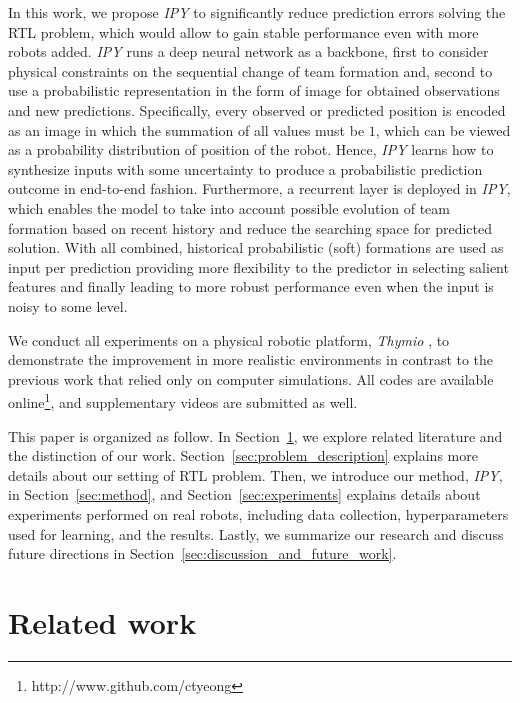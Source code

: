 \documentclass[letterpaper, 10 pt, conference]{ieeeconf}  %
\begin{document}
	In this work, we propose \emph{IPY} to significantly reduce prediction errors solving 
	the RTL problem, which would allow to gain stable performance even with more robots added. 
	\emph{IPY} runs a deep neural network as a backbone, 
	first to consider physical constraints on the sequential change of team formation and, 
	second to use a probabilistic representation in the form of image for obtained observations and 
	new predictions. Specifically, every observed or predicted position is 
	encoded as an image in which the summation of all values must be $1$, which can be
	viewed as a probability distribution of position of the robot. Hence,
	\emph{IPY} learns how to synthesize inputs with some uncertainty to produce a probabilistic 
	prediction outcome in end-to-end fashion. Furthermore, a recurrent layer is deployed in \emph{IPY}, 
	which enables the model to take into account possible evolution of 
	team formation based on recent history and reduce the searching space for predicted solution. 
	With all combined, historical probabilistic (soft) formations are used as input per prediction
	providing more flexibility to the predictor in selecting salient features and finally leading to 
	more robust performance even when the input is noisy to some level.
	
	We conduct all experiments on a physical robotic platform,
	\emph{Thymio} \cite{Shin14}, to demonstrate the improvement in more realistic environments in 
	contrast to the previous work that relied only on computer simulations. 
	All codes are available online\footnote{http://www.github.com/ctyeong}, and supplementary videos 
	are submitted as well. 
		
	This paper is organized as follow. 
	In Section~\ref{sec:related_work}, we explore related literature and the distinction of our work. 
	Section~\ref{sec:problem_description} explains more details about our setting of RTL problem. 
	Then, we introduce our method, \emph{IPY}, in Section~\ref{sec:method}, and 
	Section~\ref{sec:experiments} explains details about experiments performed on real robots, 
	including data collection, hyperparameters used for learning, and the results. 
	Lastly, we summarize our research and discuss future directions 
	in Section~\ref{sec:discussion_and_future_work}.
	
	\section{Related work}
	\label{sec:related_work}
	
\end{document}
